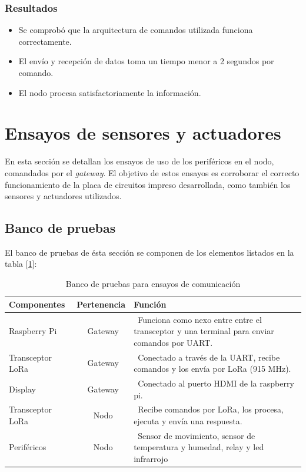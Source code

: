 \subsubsection{Resultados}

\begin{itemize}
\item Se comprobó que la arquitectura de comandos utilizada funciona correctamente.
\item El envío y recepción de datos toma un tiempo menor a 2 segundos por comando.
\item El nodo procesa satisfactoriamente la información.
\end{itemize}


\section{Ensayos de sensores y actuadores}

En esta sección se detallan los ensayos de uso de los periféricos en el nodo, comandados por el {\textit{gateway}}. El objetivo de estos ensayos es corroborar el correcto funcionamiento de la placa de circuitos impreso desarrollada, como también los sensores y actuadores utilizados.

\subsection{Banco de pruebas}

El banco de pruebas de ésta sección se componen de los elementos listados en la tabla [\ref{tab:bancodepruebas2}]:

\begin{table}[h]
	\centering
	\caption[Banco de pruebas 1]{Banco de pruebas para ensayos de comunicación}
	\begin{tabular}{l c m{7.5cm}}    
		\toprule
		\textbf{Componentes}  		& \textbf{Pertenencia}     	& \textbf{Función}																				\\
		\midrule
		Raspberry Pi				& \ Gateway 				& \ Funciona como nexo entre entre el transceptor y una terminal para enviar comandos por UART.	\\
		Transceptor LoRa 			& \ Gateway					& \ Conectado a través de la UART, recibe comandos y los envía por LoRa (915 MHz). 				\\
		Display	 					& \ Gateway 				& \ Conectado al puerto HDMI de la raspberry pi. 												\\
		Transceptor LoRa		 	& \ Nodo 					& \ Recibe comandos por LoRa, los procesa, ejecuta y envía una respuesta.						\\
		Periféricos		 			& \ Nodo 					& \ Sensor de movimiento, sensor de temperatura y humedad, relay y led infrarrojo				\\
		\bottomrule
		\hline
	\end{tabular}
	\label{tab:bancodepruebas2}
\end{table}

